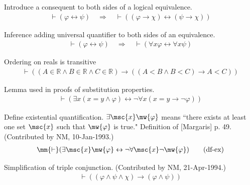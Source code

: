 
\begin{lemma} Introduce a consequent to both sides of a
logical equivalence.
\begin{align}
\vdash ( \varphi \leftrightarrow \psi )\quad\Rightarrow\quad \vdash ( ( \varphi
    \rightarrow \chi ) \leftrightarrow ( \psi \rightarrow \chi )
    )\label{eq:imbi1i}\tag{imbi1i}
\end{align}
\end{lemma}


\begin{lemma} Inference adding universal quantifier to both
sides of an equivalence.
\begin{align}
\vdash ( \varphi \leftrightarrow \psi )\quad\Rightarrow\quad \vdash ( \forall x
    \varphi \leftrightarrow \forall x \psi )\label{eq:albii}\tag{albii}
\end{align}
\end{lemma}


\begin{lemma} Ordering on reals is transitive
\begin{align}
\vdash ( ( A \in \mathbb{R} \wedge B \in \mathbb{R} \wedge C \in \mathbb{R} )
    \rightarrow ( ( A < B \wedge B < C ) \rightarrow A < C )
    )\label{eq:lttr}\tag{lttr}
\end{align}
\end{lemma}


\begin{lemma} Lemma used in proofs of substitution
properties. 
\begin{align}
\vdash ( \exists x ( x = y \wedge \varphi ) \leftrightarrow \lnot \forall x ( x
    = y \rightarrow \lnot \varphi ) )\label{eq:equs3}\tag{equs3}
\end{align}
\end{lemma}


\begin{metadefinition} Define existential quantification.
$\exists \msc{x} \mw{\varphi}$ means ``there exists at
     least one set $\msc{x}$ such that $\mw{\varphi}$ is true."  Definition of
[Margaris]
     p. 49.  (Contributed by NM, 10-Jan-1993.)
\begin{align}
\mm{\vdash} ( \exists \msc{x} \mw{\varphi} \leftrightarrow \lnot \forall
    \msc{x} \lnot \mw{\varphi} )\label{eq:df-ex}\tag{df-ex}
\end{align}
\end{metadefinition}


\begin{lemma} Simplification of triple conjunction. 
(Contributed by NM,
     21-Apr-1994.)
\begin{align}
\vdash ( ( \varphi \wedge \psi \wedge \chi ) \rightarrow ( \varphi \wedge \psi
    ) )\label{eq:3simpa}\tag{3simpa}
\end{align}
\end{lemma}


